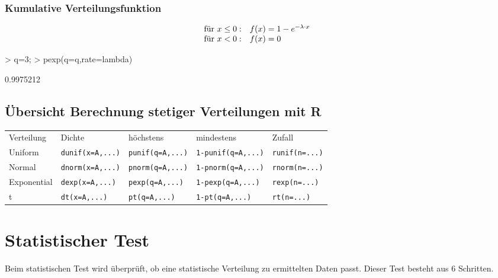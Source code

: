 \subsubsection{Kumulative Verteilungsfunktion}
\[ \begin{array}{@{}ll}
  \text{für }x \leq 0: & f(x) = 1 - e^{-\lambda \cdot x} \\
  \text{für }x < 0:    & f(x) = 0
\end{array} \]
\begin{Schunk}
\begin{Sinput}
> q=3;
> pexp(q=q,rate=lambda)
\end{Sinput}
\begin{Soutput}
[1] 0.9975212
\end{Soutput}
\end{Schunk}

\subsection{Übersicht Berechnung stetiger Verteilungen mit R}
\begin{tabular}{@{}lllll}
  \rowcolor{lgray}Verteilung &
    Dichte & 
    höchstens & 
    mindestens &
    Zufall \\
  Uniform &
    \verb!dunif(x=A,...)! &
    \verb!punif(q=A,...)! &
    \verb!1-punif(q=A,...)! &
    \verb!runif(n=...)!\\
  Normal &
    \verb!dnorm(x=A,...)! &
    \verb!pnorm(q=A,...)! &
    \verb!1-pnorm(q=A,...)! &
    \verb!rnorm(n=...)!\\
  Exponential &
    \verb!dexp(x=A,...)! &
    \verb!pexp(q=A,...)! &
    \verb!1-pexp(q=A,...)! &
    \verb!rexp(n=...)!\\
  t &
    \verb!dt(x=A,...)! &
    \verb!pt(q=A,...)! &
    \verb!1-pt(q=A,...)! &
    \verb!rt(n=...)!
\end{tabular}

\section{Statistischer Test}
Beim statistischen Test wird überprüft, ob eine statistische Verteilung zu 
ermittelten Daten passt. Dieser Test besteht aus 6 Schritten. 

